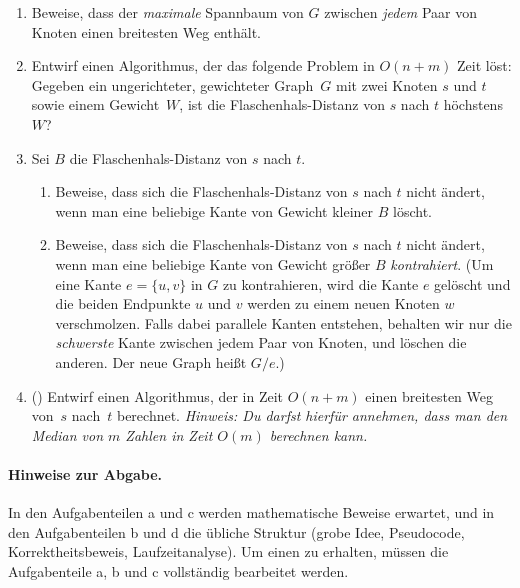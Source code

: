 \documentclass{uebung_cs}
\begin{document}
  \begin{enumerate}
      \item Beweise, dass der \emph{maximale} Spannbaum von $G$ zwischen \emph{jedem} Paar von Knoten einen breitesten Weg enthält.
      \item Entwirf einen Algorithmus, der das folgende Problem in $O(n+m)$ Zeit löst:
      Gegeben ein ungerichteter, gewichteter Graph~$G$ mit zwei Knoten $s$ und $t$ sowie einem Gewicht~$W$, ist die Flaschenhals-Distanz von $s$ nach $t$ höchstens $W$?
      \item Sei $B$ die Flaschenhals-Distanz von $s$ nach $t$.
        \begin{enumerate}[label=\roman*.]
            \item Beweise, dass sich die Flaschenhals-Distanz von $s$ nach $t$ nicht ändert, wenn man eine beliebige Kante von Gewicht kleiner $B$ löscht.
            \item Beweise, dass sich die Flaschenhals-Distanz von $s$ nach $t$ nicht ändert, wenn man eine beliebige Kante von Gewicht größer $B$ \emph{kontrahiert}.
            (Um eine Kante $e=\{u,v\}$ in $G$ zu kontrahieren, wird die Kante $e$ gelöscht und die beiden Endpunkte $u$ und $v$ werden zu einem neuen Knoten $w$ verschmolzen. Falls dabei parallele Kanten entstehen, behalten wir nur die 
            \emph{schwerste} Kante zwischen jedem Paar von Knoten, und löschen die anderen. Der neue Graph heißt $G/e$.)
        \end{enumerate}
    \item(\veryhard)
    Entwirf einen Algorithmus, der in Zeit $O(n+m)$ einen breitesten Weg von~$s$ nach~$t$ berechnet.
    \emph{Hinweis: Du darfst hierfür annehmen, dass man den Median von $m$ Zahlen in Zeit $O(m)$ berechnen kann.}
  \end{enumerate}
  
  \paragraph*{Hinweise zur Abgabe.}
  In den Aufgabenteilen a und c werden mathematische Beweise erwartet, und in den Aufgabenteilen b und d die übliche Struktur (grobe Idee, Pseudocode, Korrektheitsbeweis, Laufzeitanalyse).
  Um einen  zu erhalten, müssen die Aufgabenteile a, b und c vollständig bearbeitet werden.
\end{document}
